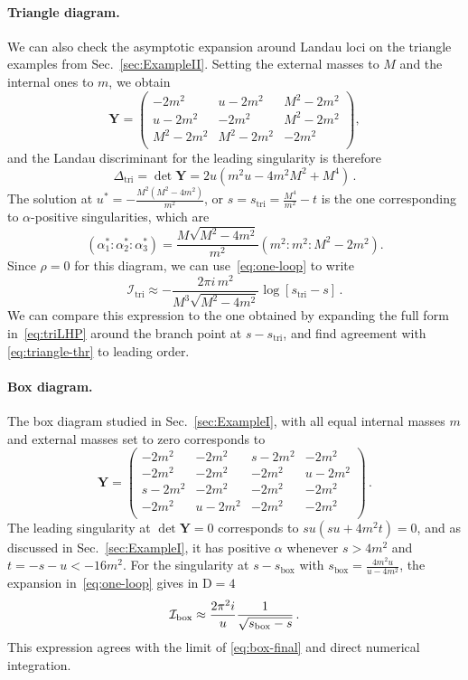 \documentclass[12pt]{article}
\numberwithin{figure}{section}
\def \be {\begin{equation}}
\def \ee {\end{equation}}
\def \D {\mathrm{D}}
\def \I {\mathcal{I}}
\def \triangle {\mathrm{tri}}
\def \boxx {\mathrm{box}}
\def \upgamma {\rho}
\def \Y {\mathbf{Y}}
\begin{document}
				\paragraph*{\bf Triangle diagram.}
				We can also check the asymptotic expansion around Landau loci on the triangle examples from Sec.~\ref{sec:ExampleII}. Setting the external masses to $M$ and the internal ones to $m$, we obtain
				\be 
				    \Y = \begin{pmatrix}
                    -2 m^2 & u -2  m^2 & M^2- 2 m^2\\
                    u - 2 m^2 & -2m^2 & M^2- 2 m^2\\
                    M^2- 2 m^2 & M^2- 2 m^2 & - 2 m^2\\
                    \end{pmatrix},
				\ee 
				and the Landau discriminant for the leading singularity is therefore
				\be
				    \Delta_{\triangle} = \det \Y =  2 u \left( m^2 u - 4 m^2 M^2 + M^4 \right) \,.
				\ee
				The solution at $u^\ast = -\frac{M^2(M^2-4m^2)}{m^2}$, or $s=s_\triangle = \frac{M^4}{m^2}-t$ is the one corresponding to $\alpha$-positive singularities, which are
				\be 
				    \left( \alpha_1^\ast : \alpha_2^\ast : \alpha_3^\ast \right) = \frac{M\sqrt{M^2-4 m^2}}{m^2}  \left( m^2 : m^2 : M^2{-}2m^2 \right).
				\ee 
				Since $\upgamma=0$ for this diagram, we can use~\eqref{eq:one-loop} to write
				\be \label{eq:triangle-thr}
				    \I_{\triangle} \approx -\frac{2 \pi i \,  m^2}{M^3 \sqrt{M^2-4 m^2}} \log \left[s_\triangle-s \right] \,.
				\ee 
				We can compare this expression to the one obtained by expanding the full form in~\eqref{eq:triLHP} around the branch point at $s - s_\triangle$, and find agreement with \eqref{eq:triangle-thr}  to leading order.
				
				\paragraph{Box diagram.}
				The box diagram studied in Sec.~\ref{sec:ExampleI}, with all equal internal masses $m$ and external masses set to zero corresponds to
				\be 
				     \Y = \begin{pmatrix}
                    -2 m^2 & -2  m^2 & s- 2 m^2 & -2 m^2\\
                    -2 m^2 & -2  m^2 & - 2 m^2 & u-2 m^2\\
                    s-2 m^2 & -2  m^2 & - 2 m^2 & -2 m^2\\
                    -2 m^2 & u-2  m^2 & - 2 m^2 & -2 m^2\\
                    \end{pmatrix} \,.
				\ee 
				The leading singularity at $\det \Y=0$ corresponds to $su(   s u + 4 m^2 t ) = 0$,
				and as discussed in Sec.~\ref{sec:ExampleI}, it has positive $\alpha$ whenever $s>4 m^2$ and $t = -s-u < -16 m^2$. For the singularity at $s-s_\boxx$ with $s_\boxx = \frac{4 m^2 u}{u-4 m^2}$, the expansion in~\eqref{eq:one-loop} gives in $\D=4$
				\be 
				    \I_{\boxx} \approx 
				    \frac{2 \pi^2 i}{u} \frac{1}{\sqrt{s_\boxx-s}}\,.\vspace{-0.4em}
				\ee
				This expression agrees with the limit of \eqref{eq:box-final} and direct numerical integration.
				
\end{document}
